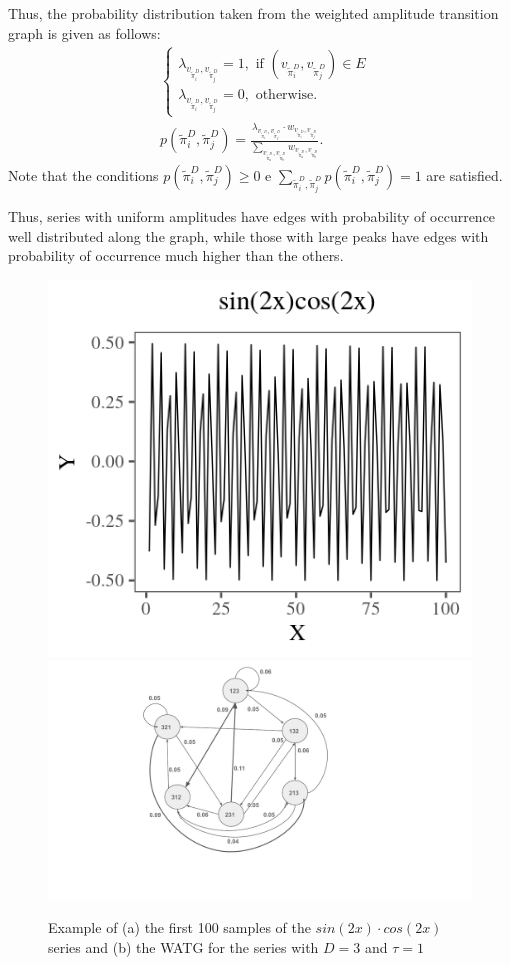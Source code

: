 \documentclass{isprs}
\begin{document}
	Thus, the probability distribution taken from the weighted amplitude transition graph is given as follows:	
	\begin{align}
	&\left\{\begin{array}{l}
	\lambda_{v_{\widetilde\pi^D_i}, v_{\widetilde\pi^D_j}} = 1, \text{ if } (v_{\widetilde\pi^D_i}, v_{\widetilde\pi^D_j}) \in {E} \\
	\lambda_{v_{\widetilde\pi^D_i}, v_{\widetilde\pi^D_j}} = 0, \text{ otherwise}.
	\end{array}\right. \\
	&p(\widetilde\pi^D_i, \widetilde\pi^D_j) = \frac{\lambda_{v_{\widetilde\pi^D_i}, v_{\widetilde\pi^D_j}} \cdot w_{v_{\widetilde\pi^D_i}, v_{\widetilde\pi^D_j}}}{\sum_{v_{\widetilde\pi^D_a}, v_{\widetilde\pi^D_b}} w_{v_{\widetilde\pi^D_a}, v_{\widetilde\pi^D_b}}}.
	\end{align}
	Note that the conditions $p(\widetilde\pi^D_i, \widetilde\pi^D_j) \ge 0$ e $\sum_{\widetilde\pi^D_i, \widetilde\pi^D_j} p(\widetilde\pi^D_i, \widetilde\pi^D_j) = 1$ are satisfied.
	
	Thus, series with uniform amplitudes have edges with probability of occurrence well distributed along the graph, while those with large peaks have edges with probability of occurrence much higher than the others.
	
	\begin{figure}[hbt]
		\centering
		\includegraphics[width=.45\linewidth]{Figures/plotsincos.png}
		\includegraphics[width=.4\linewidth]{Figures/graph.pdf}
		\caption{Example of (a) the first 100 samples of the $sin (2x) \cdot cos (2x)$ series and (b) the WATG for the series with $D = 3$ and $\tau = 1$}\label{fig:series}
	\end{figure} 
	
\end{document}
